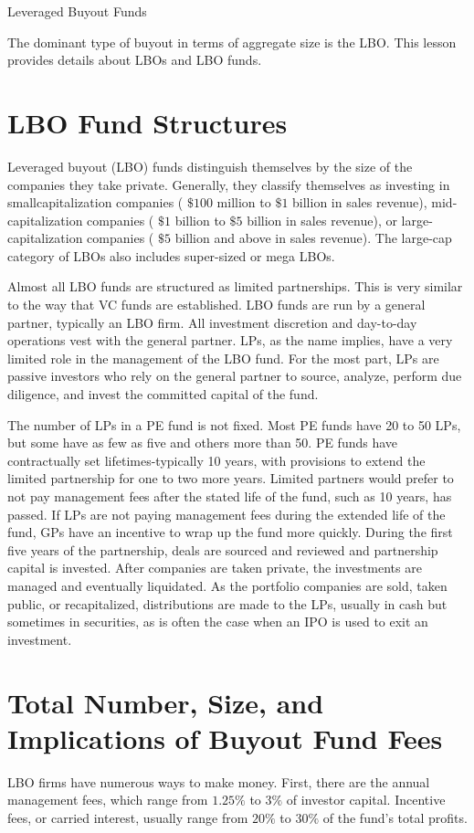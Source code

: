 \documentclass[11pt]{article}
\begin{document}
Leveraged Buyout Funds

The dominant type of buyout in terms of aggregate size is the LBO. This lesson provides details about LBOs and LBO funds.

\section*{LBO Fund Structures}
Leveraged buyout (LBO) funds distinguish themselves by the size of the companies they take private. Generally, they classify themselves as investing in smallcapitalization companies ( $\$ 100$ million to $\$ 1$ billion in sales revenue), mid-capitalization companies ( $\$ 1$ billion to $\$ 5$ billion in sales revenue), or large-capitalization companies ( $\$ 5$ billion and above in sales revenue). The large-cap category of LBOs also includes super-sized or mega LBOs.

Almost all LBO funds are structured as limited partnerships. This is very similar to the way that VC funds are established. LBO funds are run by a general partner, typically an LBO firm. All investment discretion and day-to-day operations vest with the general partner. LPs, as the name implies, have a very limited role in the management of the LBO fund. For the most part, LPs are passive investors who rely on the general partner to source, analyze, perform due diligence, and invest the committed capital of the fund.

The number of LPs in a PE fund is not fixed. Most PE funds have 20 to 50 LPs, but some have as few as five and others more than 50. PE funds have contractually set lifetimes-typically 10 years, with provisions to extend the limited partnership for one to two more years. Limited partners would prefer to not pay management fees after the stated life of the fund, such as 10 years, has passed. If LPs are not paying management fees during the extended life of the fund, GPs have an incentive to wrap up the fund more quickly. During the first five years of the partnership, deals are sourced and reviewed and partnership capital is invested. After companies are taken private, the investments are managed and eventually liquidated. As the portfolio companies are sold, taken public, or recapitalized, distributions are made to the LPs, usually in cash but sometimes in securities, as is often the case when an IPO is used to exit an investment.

\section*{Total Number, Size, and Implications of Buyout Fund Fees}
LBO firms have numerous ways to make money. First, there are the annual management fees, which range from $1.25 \%$ to $3 \%$ of investor capital. Incentive fees, or carried interest, usually range from $20 \%$ to $30 \%$ of the fund's total profits.
\end{document}
